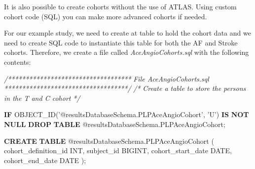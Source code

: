 \documentclass[
]{article}
\newenvironment{Shaded}{\begin{snugshade}}{\end{snugshade}}
\newcommand{\CommentTok}[1]{\textcolor[rgb]{0.56,0.35,0.01}{\textit{#1}}}
\newcommand{\ControlFlowTok}[1]{\textcolor[rgb]{0.13,0.29,0.53}{\textbf{#1}}}
\newcommand{\DataTypeTok}[1]{\textcolor[rgb]{0.13,0.29,0.53}{#1}}
\newcommand{\KeywordTok}[1]{\textcolor[rgb]{0.13,0.29,0.53}{\textbf{#1}}}
\newcommand{\NormalTok}[1]{#1}
\newcommand{\StringTok}[1]{\textcolor[rgb]{0.31,0.60,0.02}{#1}}
\begin{document}
It is also possible to create cohorts without the use of ATLAS. Using
custom cohort code (SQL) you can make more advanced cohorts if needed.

For our example study, we need to create at table to hold the cohort
data and we need to create SQL code to instantiate this table for both
the AF and Stroke cohorts. Therefore, we create a file called
\emph{AceAngioCohorts.sql} with the following contents:

\begin{Shaded}
\begin{Highlighting}[]
  \CommentTok{/***********************************}
\CommentTok{    File AceAngioCohorts.sql }
\CommentTok{  ***********************************/}
    \CommentTok{/*}
\CommentTok{    Create a table to store the persons in the T and C cohort}
\CommentTok{  */}
    
    \ControlFlowTok{IF}\NormalTok{ OBJECT_ID(}\StringTok{'@resultsDatabaseSchema.PLPAceAngioCohort'}\NormalTok{, }\StringTok{'U'}\NormalTok{) }\KeywordTok{IS} \KeywordTok{NOT} \KeywordTok{NULL} 
  \KeywordTok{DROP} \KeywordTok{TABLE}\NormalTok{ @resultsDatabaseSchema.PLPAceAngioCohort;}
  
  \KeywordTok{CREATE} \KeywordTok{TABLE}\NormalTok{ @resultsDatabaseSchema.PLPAceAngioCohort }
\NormalTok{  ( }
\NormalTok{    cohort_definition_id }\DataTypeTok{INT}\NormalTok{, }
\NormalTok{    subject_id BIGINT,}
\NormalTok{    cohort_start_date }\DataTypeTok{DATE}\NormalTok{, }
\NormalTok{    cohort_end_date }\DataTypeTok{DATE}
\NormalTok{  );}
  

\end{Highlighting}
\end{Shaded}
\end{document}
